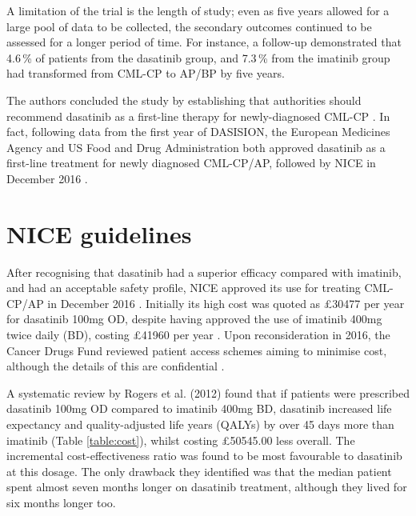 A limitation of the trial is the length of study; even as five years allowed for a large pool of data to be collected, the secondary outcomes continued to be assessed for a longer period of time. For instance, a follow-up demonstrated that 4.6\,\% of patients from the dasatinib group, and 7.3\,\% from the imatinib group had transformed from CML-CP to AP/BP by five years.

The authors concluded the study by establishing that authorities should recommend dasatinib as a first-line therapy for newly-diagnosed CML-CP \citep{RefWorks:doc:58564bd8e4b0f87b6b283223}. In fact, following data from the first year of DASISION, the European Medicines Agency and US Food and Drug Administration both approved dasatinib as a first-line treatment for newly diagnosed CML-CP/AP, followed by NICE in December 2016 \citep{RefWorks:doc:58403a89e4b088d36ea8c1b1,RefWorks:doc:585a6f1ee4b02418eb47cc08}.

\section{NICE guidelines}

After recognising that dasatinib had a \textquotesingle superior efficacy compared with imatinib, and had an acceptable safety profile\textquotesingle, NICE approved its use for treating CML-CP/AP in December 2016 \citep{RefWorks:doc:585a6f1ee4b02418eb47cc08}. Initially its \textquotesingle high cost\textquotesingle \hspace{0pt} was quoted as \pounds 30477 per year for dasatinib 100mg OD, despite having approved the use of imatinib 400mg twice daily (BD), costing \pounds 41960 per year \citep{RefWorks:doc:583b55b1e4b066125b2158e1}. Upon reconsideration in 2016, the Cancer Drugs Fund reviewed patient access schemes aiming to minimise cost, although the details of this are confidential \citep{RefWorks:doc:585a6f1ee4b02418eb47cc08}.

A systematic review by Rogers et al. (2012) found that if patients were prescribed dasatinib 100mg OD compared to imatinib 400mg BD, dasatinib increased life expectancy and quality-adjusted life years (QALYs) by over 45 days more than imatinib (Table \ref{table:cost}), whilst costing \pounds 50545.00 less overall. The incremental cost-effectiveness ratio was found to be most favourable to dasatinib at this dosage. The only drawback they identified was that the median patient spent almost seven months longer on dasatinib treatment, although they lived for six months longer too.

